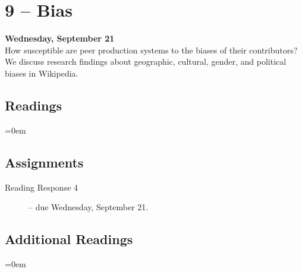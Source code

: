 \documentclass[11pt]{memoir}
\newenvironment{readinglist}{
\begin{list}{}{\leftmargin=8pt \itemindent=0em}
  \setlength{\itemsep}{8pt}
  \setlength{\parskip}{0em}
  \setlength{\parsep}{1em}
  \setlength{\parindent}{8em}}
{\end{list}}
\begin{document}
\section{9 -- Bias}
\textcolor{CUGold}{\textbf{Wednesday, September 21}}\\
How susceptible are peer production systems to the biases of their contributors? We discuss research findings about geographic, cultural, gender, and political biases in Wikipedia.

    \subsection{Readings}
    \begin{readinglist}
        \item {}
        \item {}
        \item {}
    \end{readinglist}
    
    \subsection{Assignments}
    \begin{description}%
        \item[Reading Response 4 ] -- due Wednesday, September 21. 
    \end{description}
    
    \subsection{Additional Readings}
    \begin{readinglist}
        \item {}
        \item {}
        \item {}
        \item {}
        \item {}
        \item {}
        \item {}
    \end{readinglist}

\end{document}
